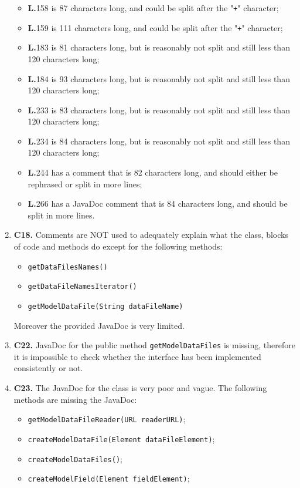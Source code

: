 \begin{enumerate}
\begin{itemize}
	\item \textbf{L.}158 is 87 characters long, and could be split after the "\texttt{+}" character;
	\item \textbf{L.}159 is 111 characters long, and could be split after the "\texttt{+}" character;
	\item \textbf{L.}183 is 81 characters long, but is reasonably not split and still less than 120 characters long;
	\item \textbf{L.}184 is 93 characters long, but is reasonably not split and still less than 120 characters long;
	\item \textbf{L.}233 is 83 characters long, but is reasonably not split and still less than 120 characters long;
	\item \textbf{L.}234 is 84 characters long, but is reasonably not split and still less than 120 characters long;
	\item \textbf{L.}244 has a comment that is 82 characters long, and should either be rephrased or split in more lines;
	\item \textbf{L.}266 has a JavaDoc comment that is 84 characters long, and should be split in more lines.
	\end{itemize}
\item \textbf{C18.} Comments are NOT used to adequately explain what the class, blocks of code and methods do except for the following methods:
	\begin{itemize}
	\item \texttt{getDataFilesNames()}
	\item \texttt{getDataFileNamesIterator()}
	\item \texttt{getModelDataFile(String dataFileName)}
	\end{itemize}
Moreover the provided JavaDoc is very limited.
\item \textbf{C22.} JavaDoc for the public method \texttt{getModelDataFiles} is missing, therefore it is impossible to check whether the interface has been implemented consistently or not.
\item \textbf{C23.} The JavaDoc for the class is very poor and vague. The following methods are missing the JavaDoc:
	\begin{itemize}
	\item \texttt{getModelDataFileReader(URL readerURL)};
	\item \texttt{createModelDataFile(Element dataFileElement)};
	\item \texttt{createModelDataFiles()};
	\item \texttt{createModelField(Element fieldElement)};

\end{itemize}
\end{enumerate}
